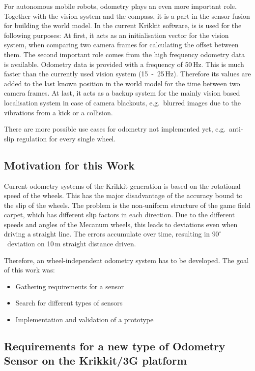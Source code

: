 \documentclass[12pt,a4paper]{article}
\begin{document}
For autonomous mobile robots, odometry plays an even more important role.
Together with the vision system and the compass, it is a part in the sensor fusion for building the world model.
In the current Krikkit software, is is used for the following purposes:
At first, it acts as an initialisation vector for the vision system, when comparing two camera frames for calculating the offset between them.
The second important role comes from the high frequency odometry data is available.
Odometry data is provided with a frequency of 50\,Hz. 
This is much faster than the currently used vision system (15~-~25\,Hz). 
Therefore its values are added to the last known position in the world model for the time between two camera frames.
At last, it acts as a backup system for the mainly vision based localisation system in case of camera blackouts, e.g.\ blurred images due to the vibrations from a kick or a collision.

There are more possible use cases for odometry not implemented yet, e.g.\ anti-slip regulation for every single wheel.



\subsection{Motivation for this Work}
  
Current odometry systems of the Krikkit generation is based on the rotational speed of the wheels.
This has the major disadvantage of the accuracy bound to the slip of the wheels.
The problem is the non-uniform structure of the game field carpet, which has different slip factors in each direction.
Due to the different speeds and angles of the Mecanum wheels, this leads to deviations even when driving a straight line.
The errors accumulate over time, resulting in $90^\circ$~deviation on 10\,m straight distance driven.

Therefore, an wheel-independent odometry system has to be developed.
The goal of this work was:

\begin{itemize}
  \item Gathering requirements for a sensor
  \item Search for different types of sensors
  \item Implementation and validation of a prototype
\end{itemize}


\subsection{Requirements for a new type of Odometry Sensor on the Krikkit/3G platform}
\end{document}
